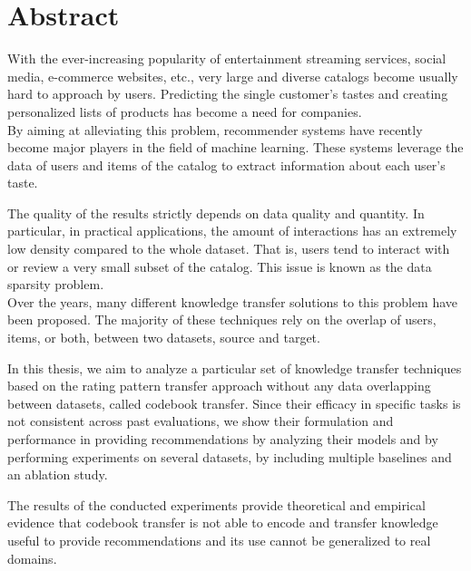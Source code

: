 \chapter*{Abstract}

With the ever-increasing popularity of entertainment streaming services, social media, e-commerce websites, etc., very large and diverse catalogs become usually hard to approach by users. Predicting the single customer's tastes and creating personalized lists of products has become a need for companies.\\
By aiming at alleviating this problem, recommender systems have recently become major players in the field of machine learning. These systems leverage the data of users and items of the catalog to extract information about each user's taste.\par
The quality of the results strictly depends on data quality and quantity. In particular, in practical applications, the amount of interactions has an extremely low density compared to the whole dataset. That is, users tend to interact with or review a very small subset of the catalog. This issue is known as the data sparsity problem.\\
Over the years, many different knowledge transfer solutions to this problem have been proposed. The majority of these techniques rely on the overlap of users, items, or both, between two datasets, source and target.\par
In this thesis, we aim to analyze a particular set of knowledge transfer techniques based on the rating pattern transfer approach without any data overlapping between datasets, called codebook transfer. Since their efficacy in specific tasks is not consistent across past evaluations, we show their formulation and performance in providing recommendations by analyzing their models and by performing experiments on several datasets, by including multiple baselines and an ablation study.\par
The results of the conducted experiments provide theoretical and empirical evidence that codebook transfer is not able to encode and transfer knowledge useful to provide recommendations and its use cannot be generalized to real domains.